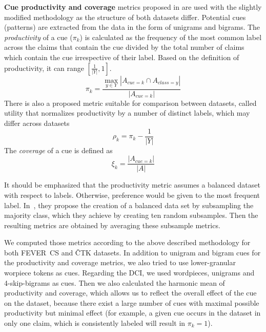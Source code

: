     
    \textbf{Cue productivity and coverage} metrics proposed in \parencite{Niven_2019} are used with the slightly modified methodology as the structure of both datasets differ. Potential cues (patterns) are extracted from the data in the form of unigrams and bigrams. The \emph{productivity} of a cue ($\pi_{k}$) is calculated as the frequency of the most common label across the claims that contain the cue divided by the total number of claims which contain the cue irrespective of their label. Based on the definition of productivity, it can range $[\frac{1}{|Y|}, 1]$.
    \begin{equation} \label{equ:productivity-cue}
        \pi_k = \frac{\max\limits_{y \in Y} |A_{cue = k} \cap A_{class = y}|}{|A_{cue = k}|}
    \end{equation}
    \noindent There is also a proposed metric suitable for comparison between datasets, called utility that normalizes productivity by a number of distinct labels, which may differ across datasets
    \begin{equation} \label{equ:utility-cue}
        \rho_{k} = \pi_{k} - \frac{1}{|Y|}
    \end{equation} The \emph{coverage} of a cue is defined as 
    \begin{equation} \label{equ:coverage-cue}
        \xi_{k} = \frac{|A_{cue = k}|}{|A|}
    \end{equation} 

    It should be emphasized that the productivity metric assumes a balanced dataset with respect to labels. Otherwise, preference would be given to the most frequent label. In~\parencite{derczynski-etal-2020-claim-quality}, they propose the creation of a balanced data set by subsampling the majority class, which they achieve by creating ten random subsamples. Then the resulting metrics are obtained by averaging these subsample metrics.

    We computed those metrics according to the above described methodology for both FEVER~CS and ČTK datasets.  In addition to unigram and bigram cues for the productivity and coverage metrics, we also tried to use lower-granular worpiece tokens as cues. Regarding the DCI, we used wordpieces, unigrams and 4-skip-bigrams as cues. Then we also calculated the harmonic mean of productivity and coverage, which allows us to reflect the overall effect of the cue on the dataset, because there exist a large number of cues with maximal possible productivity but minimal effect (for example, a given cue occurs in the dataset in only one claim, which is consistently labeled will result in $\pi_k = 1$).
    
